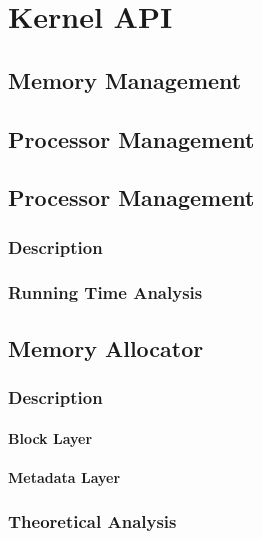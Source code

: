 \documentclass[12pt]{report}
\begin{document}
\part{Kernel API}

\chapter{Memory Management}

\chapter{Processor Management}

\chapter{Processor Management}

\section{Description}

\section{Running Time Analysis}

\chapter{Memory Allocator}

\section{Description}

\subsection{Block Layer}

\subsection{Metadata Layer}

\section{Theoretical Analysis}
\end{document}
